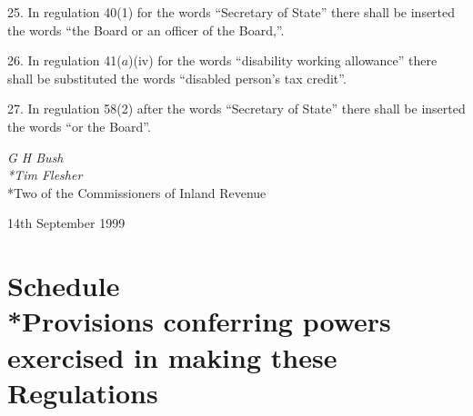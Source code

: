 \documentclass[12pt,a4paper]{article}
\begin{document}
\medskip

25.  In regulation 40(1) for the words “Secretary of State” there shall be inserted the words “the Board or an officer of the Board,”.

\medskip

26.  In regulation 41($a$)(iv) for the words “disability working allowance” there shall be substituted the words “disabled person’s tax credit”.

\medskip

27.  In regulation 58(2) after the words “Secretary of State” there shall be inserted the words “or the Board”. 

\bigskip


{\raggedleft

\emph{G H Bush\\*Tim Flesher}\\*Two of the Commissioners of Inland Revenue

}

14th September 1999

\small

\part[Schedule --- Provisions conferring powers exercised in making these Regulations]{Schedule\\*Provisions conferring powers exercised in making these Regulations}
\end{document}
